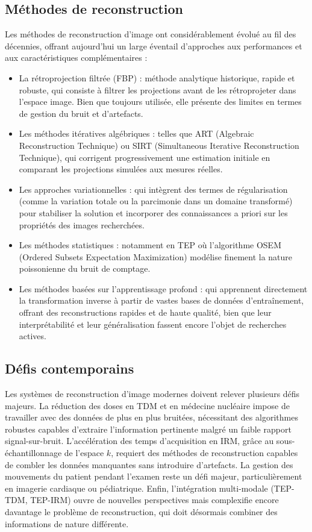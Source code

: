 \subsection{Méthodes de reconstruction}
Les méthodes de reconstruction d'image ont considérablement évolué au fil des décennies, offrant aujourd'hui un large éventail d'approches aux performances et aux caractéristiques complémentaires :
\begin{itemize}
\item[-]La rétroprojection filtrée (FBP) : méthode analytique historique, rapide et robuste, qui consiste à filtrer les projections avant de les rétroprojeter dans l'espace image. Bien que toujours utilisée, elle présente des limites en termes de gestion du bruit et d'artefacts.

\item[-]Les méthodes itératives algébriques : telles que ART (Algebraic Reconstruction Technique) ou SIRT (Simultaneous Iterative Reconstruction Technique), qui corrigent progressivement une estimation initiale en comparant les projections simulées aux mesures réelles.

\item[-]Les approches variationnelles : qui intègrent des termes de régularisation (comme la variation totale ou la parcimonie dans un domaine transformé) pour stabiliser la solution et incorporer des connaissances a priori sur les propriétés des images recherchées.

\item[-]Les méthodes statistiques : notamment en TEP où l'algorithme OSEM (Ordered Subsets Expectation Maximization) modélise finement la nature poissonienne du bruit de comptage.

\item[-]Les méthodes basées sur l'apprentissage profond : qui apprennent directement la transformation inverse à partir de vastes bases de données d'entraînement, offrant des reconstructions rapides et de haute qualité, bien que leur interprétabilité et leur généralisation fassent encore l'objet de recherches actives.
\end{itemize}
\subsection{Défis contemporains}
Les systèmes de reconstruction d'image modernes doivent relever plusieurs défis majeurs. La réduction des doses en TDM et en médecine nucléaire impose de travailler avec des données de plus en plus bruitées, nécessitant des algorithmes robustes capables d'extraire l'information pertinente malgré un faible rapport signal-sur-bruit. L'accélération des temps d'acquisition en IRM, grâce au sous-échantillonnage de l'espace \( k \), requiert des méthodes de reconstruction capables de combler les données manquantes sans introduire d'artefacts. La gestion des mouvements du patient pendant l'examen reste un défi majeur, particulièrement en imagerie cardiaque ou pédiatrique. Enfin, l'intégration multi-modale (TEP-TDM, TEP-IRM) ouvre de nouvelles perspectives mais complexifie encore davantage le problème de reconstruction, qui doit désormais combiner des informations de nature différente.

